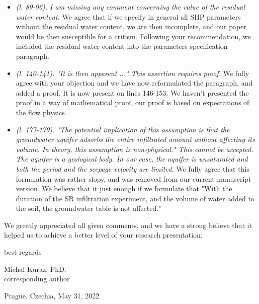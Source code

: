\documentclass[a4paper,10pt]{letter}
\begin{document}
\begin{itemize}
  \item {\it  (l. 89-96). I am missing any comment concerning the value of the
  residual water content.} We agree that if we specify in general all SHP parameters  without the residual water content, we are then incomplete, and our paper would be then susceptible for a critism. Following your recommendation, we included the residual water content into the parameters specification paragraph.
  \item {\it (l. 140-141). "It is then apparent ..." This assertion requires
  proof.} We fully agree with your objection and we have now reformulated the paragraph, and added a proof. It is now present on lines 146-153. We haven't presented the proof in a way of mathematical proof, our proof is based on expectations of the flow physics.
  \item {\it (l. 177-179). "The potential implication of this assumption is that
  the groundwater aquifer adsorbs the entire infiltrated amount without
  affecting its volume. In theory, this assumption is non-physical."
  This cannot be accepted. The aquifer is a geological body. In our
  case, the aquifer is unsaturated and both the period and the seepage
  velocity are limited.} We fully agree that this formulation was rather slopy, and was removed from our current manuscript version. We believe that it just enough if we formulate that "With the duration of the SR infiltration experiment, and the volume of water added to the soil, the groundwater table is not affected."
  \end{itemize}
  
  We greatly appreciated all given comments, and we have a strong believe that it helped us to achieve a better level of your research presentation.
  
  \begin{center} 
  
  best regards
  \end{center}
  
  \flushright Michal Kuraz, PhD. \\
 corresponding author
  
  \flushleft
  Prague, Czechia, May 31, 2022
  
\end{document}
